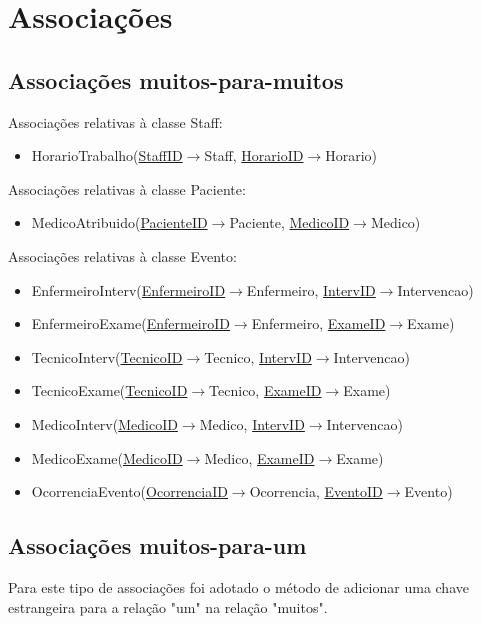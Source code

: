 \documentclass[article, a4paper, 12pt, oneside]{memoir}
\begin{document}
\section{Associações}
\subsection{Associações muitos-para-muitos}
Associações relativas à classe Staff:
\begin{itemize}
	\item HorarioTrabalho(\underline{StaffID}$\rightarrow$Staff, \underline{HorarioID}$\rightarrow$Horario)
\end{itemize}

Associações relativas à classe Paciente:
\begin{itemize}
	\item MedicoAtribuido(\underline{PacienteID}$\rightarrow$Paciente, \underline{MedicoID}$\rightarrow$Medico)
\end{itemize}

Associações relativas à classe Evento:
\begin{itemize}
	\item EnfermeiroInterv(\underline{EnfermeiroID}$\rightarrow$Enfermeiro, \underline{IntervID}$\rightarrow$Intervencao)
	\item EnfermeiroExame(\underline{EnfermeiroID}$\rightarrow$Enfermeiro, \underline{ExameID}$\rightarrow$Exame)
	\item TecnicoInterv(\underline{TecnicoID}$\rightarrow$Tecnico, \underline{IntervID}$\rightarrow$Intervencao)
	\item TecnicoExame(\underline{TecnicoID}$\rightarrow$Tecnico, \underline{ExameID}$\rightarrow$Exame)
	\item MedicoInterv(\underline{MedicoID}$\rightarrow$Medico, \underline{IntervID}$\rightarrow$Intervencao)
	\item MedicoExame(\underline{MedicoID}$\rightarrow$Medico, \underline{ExameID}$\rightarrow$Exame)
	\item OcorrenciaEvento(\underline{OcorrenciaID}$\rightarrow$Ocorrencia, \underline{EventoID}$\rightarrow$Evento)
\end{itemize}

\subsection{Associações muitos-para-um}
Para este tipo de associações foi adotado o método de adicionar uma chave estrangeira para a relação "um" na relação "muitos".
\end{document}
